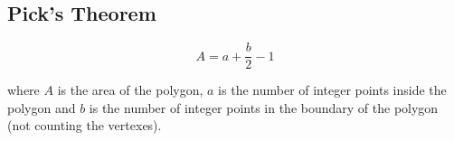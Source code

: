 \subsection{Pick's Theorem}
$$ A = a + \dfrac{b}{2} - 1 $$

where $A$ is the area of the polygon, $a$ is the number of integer points inside the polygon and $b$ is the number of integer points in the boundary of the polygon (not counting the vertexes).
